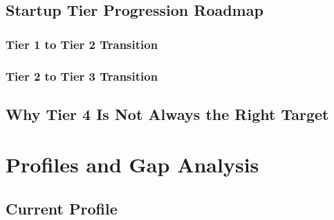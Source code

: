 
\subsection{Startup Tier Progression Roadmap}


\subsubsection{Tier 1 to Tier 2 Transition}




\subsubsection{Tier 2 to Tier 3 Transition}






\subsection{Why Tier 4 Is Not Always the Right Target}


\section{Profiles and Gap Analysis}



\subsection{Current Profile}



